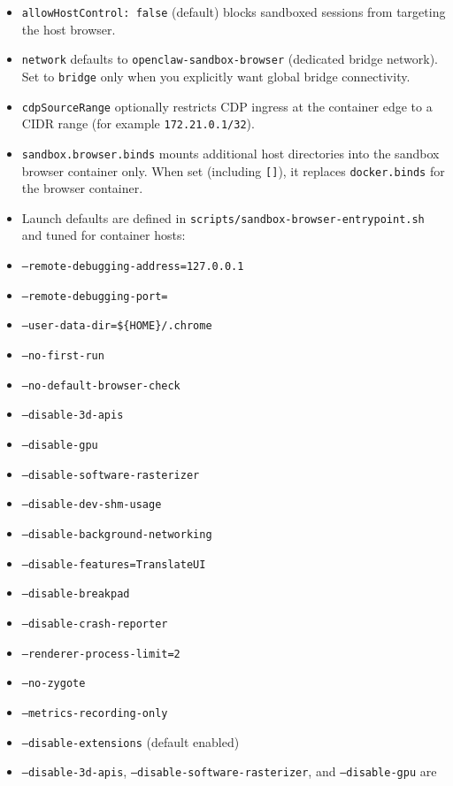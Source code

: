 \begin{itemize}
  \item \texttt{allowHostControl: false} (default) blocks sandboxed sessions from targeting the host browser.
  \item \texttt{network} defaults to \texttt{openclaw-sandbox-browser} (dedicated bridge network). Set to \texttt{bridge} only when you explicitly want global bridge connectivity.
  \item \texttt{cdpSourceRange} optionally restricts CDP ingress at the container edge to a CIDR range (for example \texttt{172.21.0.1/32}).
  \item \texttt{sandbox.browser.binds} mounts additional host directories into the sandbox browser container only. When set (including \texttt{[]}), it replaces \texttt{docker.binds} for the browser container.
  \item Launch defaults are defined in \texttt{scripts/sandbox-browser-entrypoint.sh} and tuned for container hosts:
  \item \texttt{--remote-debugging-address=127.0.0.1}
  \item \texttt{--remote-debugging-port=}
  \item \texttt{--user-data-dir=\$\{HOME\}/.chrome}
  \item \texttt{--no-first-run}
  \item \texttt{--no-default-browser-check}
  \item \texttt{--disable-3d-apis}
  \item \texttt{--disable-gpu}
  \item \texttt{--disable-software-rasterizer}
  \item \texttt{--disable-dev-shm-usage}
  \item \texttt{--disable-background-networking}
  \item \texttt{--disable-features=TranslateUI}
  \item \texttt{--disable-breakpad}
  \item \texttt{--disable-crash-reporter}
  \item \texttt{--renderer-process-limit=2}
  \item \texttt{--no-zygote}
  \item \texttt{--metrics-recording-only}
  \item \texttt{--disable-extensions} (default enabled)
  \item \texttt{--disable-3d-apis}, \texttt{--disable-software-rasterizer}, and \texttt{--disable-gpu} are
\end{itemize}

